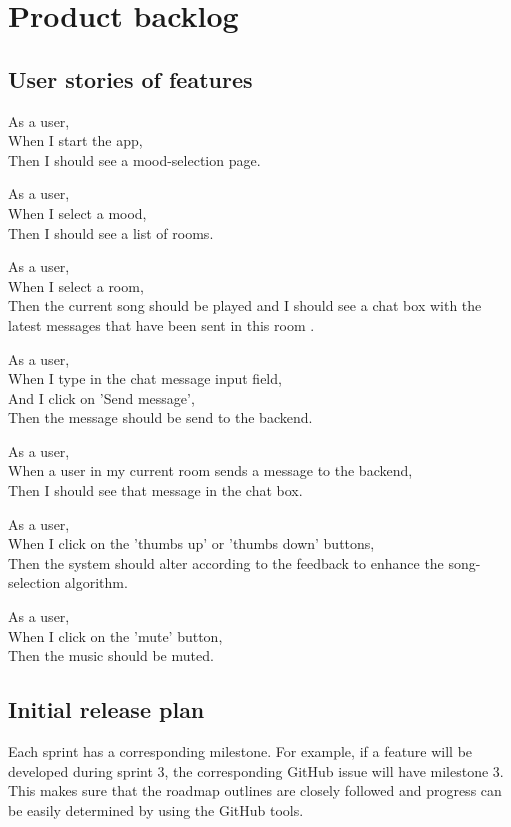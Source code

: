\chapter{Product backlog}

\section{User stories of features}
As a user,\\
When I start the app,\\
Then I should see a mood-selection page.

As a user,\\
When I select a mood,\\
Then I should see a list of rooms.

As a user,\\
When I select a room,\\
Then the current song should be played and I should see a chat box with the latest messages that have been sent in this room .

As a user,\\
When I type in the chat message input field,\\
And I click on 'Send message',\\
Then the message should be send to the backend.

As a user,\\
When a user in my current room sends a message to the backend,\\
Then I should see that message in the chat box.

As a user,\\
When I click on the 'thumbs up' or 'thumbs down' buttons,\\
Then the system should alter according to the feedback to enhance the song-selection algorithm.

As a user,\\
When I click on the 'mute' button,\\
Then the music should be muted.


\section{Initial release plan}
Each sprint has a corresponding milestone. For example, if a feature will be developed during sprint 3, the corresponding GitHub issue will have milestone 3. This makes sure that the roadmap outlines are closely followed and progress can be easily determined by using the GitHub tools.

